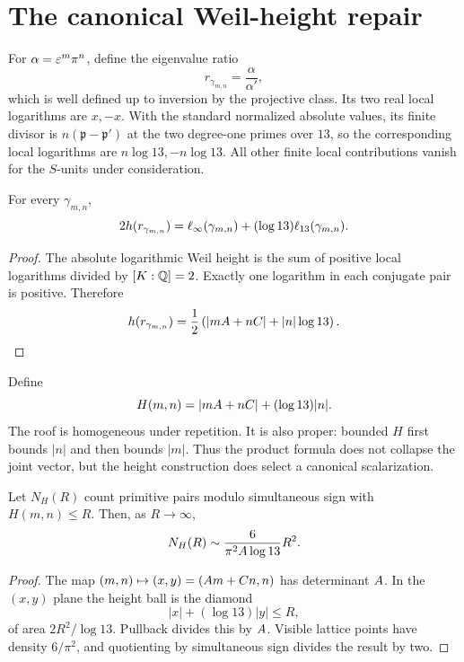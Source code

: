 \section{The canonical Weil-height repair}

For $\alpha=\varepsilon^m\pi^n$, define the eigenvalue ratio
\[
r_{\gamma_{m,n}}=\frac{\alpha}{\alpha'},
\]
which is well defined up to inversion by the projective class.  Its two real
local logarithms are $x,-x$.  With the standard normalized absolute values,
its finite divisor is $n(\mathfrak p-\mathfrak p')$ at the two degree-one
primes over $13$, so the corresponding local logarithms are
$n\log13,-n\log13$.  All other finite local contributions vanish for the
$S$-units under consideration.

\begin{theorem}\label{thm:height}
For every $\gamma_{m,n}$,
\[
2h(r_{\gamma_{m,n}})
=\ell_{\infty}(\gamma_{m,n})+(\log13)\ell_{13}(\gamma_{m,n}).
\]
\end{theorem}

\begin{proof}
The absolute logarithmic Weil height is the sum of positive local logarithms
divided by $[K:\mathbb{Q}]=2$.  Exactly one logarithm in each conjugate pair is
positive.  Therefore
\[
h(r_{\gamma_{m,n}})
=\frac12\left(|mA+nC|+|n|\log13\right).
\]
\end{proof}

Define
\[
H(m,n)=|mA+nC|+(\log13)|n|.
\]
The roof is homogeneous under repetition.  It is also proper: bounded $H$
first bounds $|n|$ and then bounds $|m|$.  Thus the product formula does not
collapse the joint vector, but the height construction does select a
canonical scalarization.

\begin{proposition}\label{prop:height-count}
Let $N_H(R)$ count primitive pairs modulo simultaneous sign with
$H(m,n)\le R$.  Then, as $R\to\infty$,
\[
N_H(R)\sim\frac{6}{\pi^2A\log13}R^2.
\]
\end{proposition}

\begin{proof}
The map $(m,n)\mapsto(x,y)=(A m+C n,n)$ has determinant $A$.  In the
$(x,y)$ plane the height ball is the diamond
\[
|x|+(\log13)|y|\le R,
\]
of area $2R^2/\log13$.  Pullback divides this by $A$.  Visible lattice
points have density $6/\pi^2$, and quotienting by simultaneous sign divides
the result by two.
\end{proof}

